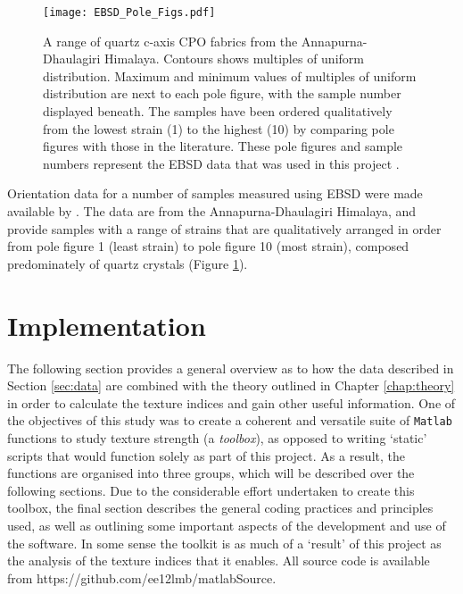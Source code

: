 \documentclass[a4paper,12pt,twoside]{report}
\numberwithin{equation}{chapter}
\begin{document}
\begin{figure}[h!]
  \centering
    \texttt{[image: EBSD\_Pole\_Figs.pdf]}
  \caption[EBSD data (pole figures)]{A range of quartz c-axis CPO fabrics from the Annapurna-Dhaulagiri Himalaya. Contours shows multiples of uniform distribution. Maximum and minimum values of multiples of uniform distribution are next to each pole figure, with the sample number displayed beneath. The samples have been ordered qualitatively from the lowest strain (1) to the highest (10) by comparing pole figures with those in the literature. These pole figures and sample numbers represent the EBSD data that was used in this project \citep[made available from][]{ParsonsThesis}.}
  \label{fig:EBSD_data}
\end{figure}  
    

Orientation data for a number of samples measured using EBSD were made available by \cite{ParsonsThesis}. The data are from the Annapurna-Dhaulagiri Himalaya, and provide samples with a range of strains that are qualitatively arranged in order from pole figure 1 (least strain) to pole figure 10 (most strain), composed predominately of quartz crystals (Figure \ref{fig:EBSD_data}). 



\section{Implementation}

The following section provides a general overview as to how the data described in Section \ref{sec:data} are combined with the theory outlined in Chapter \ref{chap:theory} in order to calculate the texture indices and gain other useful information. One of the objectives of this study was to create a coherent and versatile suite of \texttt{Matlab} functions to study texture strength (a \emph{toolbox}), as opposed to writing \lq{}static\rq{} scripts that would function solely as part of this project. As a result, the functions are organised into three groups, which will be described over the following sections. Due to the considerable effort undertaken to create this toolbox, the final section describes the general coding practices and principles used, as well as outlining some important aspects of the development and use of the software. In some sense the toolkit is as much of a \lq{}result\rq{} of this project as the analysis of the texture indices that it enables. All source code is available from https://github.com/ee12lmb/matlabSource.                                                                                                     
\end{document}
